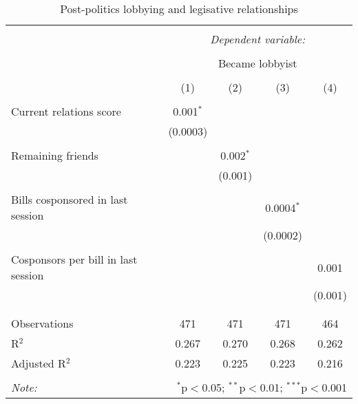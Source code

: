 \documentclass{article}
\begin{document}
  \begin{table}[!htbp] \centering 
    \caption{Post-politics lobbying and legisative relationships} 
    \label{tab:lobbying_relations} 
    \begin{tabular}{@{\extracolsep{5pt}}lcccc} 
        \\[-1.8ex]\hline 
        \hline \\[-1.8ex] 
         & \multicolumn{4}{c}{\textit{Dependent variable:}} \\ 
        \cline{2-5} 
        \\[-1.8ex] & \multicolumn{4}{c}{Became lobbyist} \\ 
        \\[-1.8ex] & (1) & (2) & (3) & (4)\\ 
        \hline \\[-1.8ex] 
         Current relations score & 0.001$^{*}$ &  &  &  \\ 
          & (0.0003) &  &  &  \\ 
          & & & & \\ 
         Remaining friends &  & 0.002$^{*}$ &  &  \\ 
          &  & (0.001) &  &  \\ 
          & & & & \\ 
         Bills cosponsored in last session &  &  & 0.0004$^{*}$ &  \\ 
          &  &  & (0.0002) &  \\ 
          & & & & \\ 
         Cosponsors per bill in last session &  &  &  & 0.001 \\ 
          &  &  &  & (0.001) \\ 
          & & & & \\ 
        \hline \\[-1.8ex] 
        Observations & 471 & 471 & 471 & 464 \\ 
        R$^{2}$ & 0.267 & 0.270 & 0.268 & 0.262 \\ 
        Adjusted R$^{2}$ & 0.223 & 0.225 & 0.223 & 0.216 \\ 
        \hline 
        \hline \\[-1.8ex] 
        \textit{Note:}  & \multicolumn{4}{r}{$^{*}$p$<$0.05; $^{**}$p$<$0.01; $^{***}$p$<$0.001} \\ 
        \end{tabular} 
  \end{table} 
\nocite{stargazer}
\end{document}
